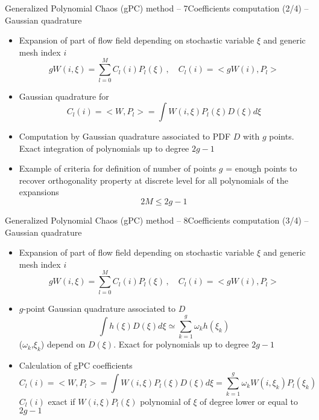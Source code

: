 \documentclass[10pt]{beamer}
\def\vt{\vspace{2mm}}
\def\begit{\begin{itemize}}
\def\endit{\end{itemize}}
\begin{document}
\begin{frame}{Generalized Polynomial Chaos (gPC) method -- 7}{Coefficients computation (2/4) -- Gaussian quadrature}
%
\footnotesize{
%
\begit
%
\item Expansion of part of flow field  depending on stochastic variable $\xi$ and generic mesh index $i$
%
    $$     gW(i,\xi) = \sum_{l=0}^M C_l(i) P_l(\xi)\,, \quad C_l(i) =  <gW(i),P_l> $$
%
\item Gaussian quadrature for
  $$ C_l(i)  = <W,P_l> =  \displaystyle\int W(i,\xi)P_l(\xi) D(\xi) d\xi$$
\item Computation by Gaussian quadrature associated to PDF $D$ with $g$ points. Exact integration of polynomials up to degree $2g-1$
\item Example of criteria for definition of number of points $g$ = enough points to recover orthogonality property at discrete level 
 for all polynomials of the expansions 
 $$ 2 M \leq 2g -1 $$    
%
\endit
%
}
%
\end{frame} 
%
%
\begin{frame}{Generalized Polynomial Chaos (gPC) method -- 8}{Coefficients computation (3/4) -- Gaussian quadrature}
%
\footnotesize{
%
\begit
%
\item Expansion of part of flow field  depending on stochastic variable $\xi$ and generic mesh index $i$
%
    $$  gW(i,\xi) = \sum_{l=0}^M C_l(i) P_l(\xi)\,,\quad C_l(i) =  <gW(i),P_l> $$
%
\item $g$-point Gaussian quadrature associated to $D$
      $$ \int h(\xi) D(\xi) d\xi \simeq \sum_{k=1}^{g} \omega_k h(\xi_k) $$ 
  ($\omega_k$,$\xi_k$) depend on $D(\xi)$. Exact for polynomials up to degree $2g-1$
%
\vt
\item Calculation of gPC coefficients
  $$ C_l(i) = <W,P_l> =  \displaystyle\int W(i,\xi)P_l(\xi) D(\xi) d\xi = \sum_{k=1}^{g} \omega_k W(i,\xi_k)P_l(\xi_k)  $$
  $C_l(i)$ exact if $W(i,\xi)P_l(\xi)$ polynomial of $\xi$ of degree lower or equal to $2g-1$
%
\endit
%
}
%
\end{frame} 

\end{document}
